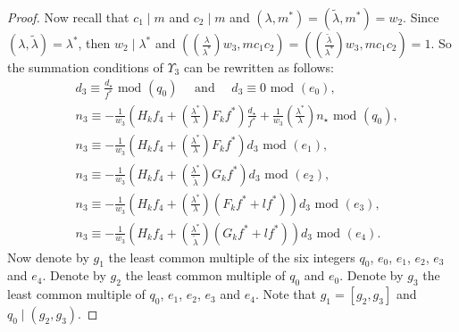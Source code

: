 \documentclass{amsart}
\numberwithin{equation}{section}
\begin{document}
\begin{proof}
\vspace{3mm}
Now recall that $c_1 \mid m$ and $c_2 \mid m$ and $(\lambda,m^*)=(\widetilde{\lambda},m^*)=w_2$. Since $(\lambda,\widetilde{\lambda})=\lambda^*$, then $w_2 \mid \lambda^*$ and $((\frac{\lambda}{\lambda^*})w_3,mc_1c_2)=((\frac{\widetilde{\lambda}}{\lambda^*})w_3,mc_1c_2)=1$. So the summation conditions of $\Upsilon_3$ can be rewritten as follows:
\begingroup
\allowdisplaybreaks
\begin{align} \label{equ:congruencyddd}
&d_3 \equiv \frac{d_\star }{f^*} \mbox{ mod } (q_0) \quad \mbox{ and } \quad  d_3 \equiv 0 \mbox{ mod } (e_0),  \\  
&n_3\equiv - \frac{1}{w_3}\left(H_kf_4 + \left(\frac{\lambda^*}{\lambda}\right)F_k f^* \right)\frac{d_\star}{f^*} + \frac{1}{w_3} \left(\frac{\lambda^*}{\lambda}\right)n_\star  \mbox{ mod } (q_0),\label{equ:congruency0} \\ 
\label{equ:congruency1}
&n_3 \equiv - \frac{1}{w_3}\left( H_kf_4  +\left(\frac{\lambda^*}{\lambda}\right) F_k f^*  \right)d_3\mbox{ mod } \left(e_1\right),\\
\label{equ:congruency2}
&n_3 \equiv - \frac{1}{w_3}\left( H_kf_4  +\left(\frac{\lambda^*}{\widetilde{\lambda}}\right) G_k f^*  \right)d_3\mbox{ mod } \left(e_2\right), \\
\label{equ:congruency3}
&n_3 \equiv - \frac{1}{w_3}\left( H_kf_4  +\left(\frac{\lambda^*}{\lambda}\right)(F_k f^* +l f^*) \right)d_3\mbox{ mod } \left(e_3\right),
\\
\label{equ:congruency4}
&n_3 \equiv - \frac{1}{w_3}\left( H_kf_4  +\left(\frac{\lambda^*}{\widetilde{\lambda}}\right)(G_k f^* +l f^*) \right)d_3\mbox{ mod } \left(e_4\right).
\end{align}
\endgroup
Now denote by $g_1$ the least common multiple of the six integers $q_0$, $e_0$, $e_1$, $e_2$, $e_3$ and $e_4$. Denote by $g_2$ the least common multiple of $q_0$ and $e_0$. Denote by $g_3$ the least common multiple of $q_0$, $e_1$, $e_2$, $e_3$ and $e_4$. Note that $g_1 = [g_2,g_3]$ and $q_0 \mid (g_2,g_3)$. 






\end{proof}
\end{document}
